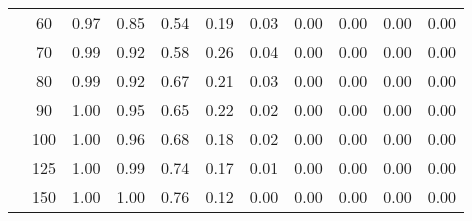\begin{table}[t]
\begin{center}
\begin{subtable}[c]{\textwidth}
\begin{center}
\begin{tabular}{rcccccccccc}
                                        & \multicolumn{1}{c|}{60}  & \num{0.97}  & \num{0.85}  & \num{0.54}  & \num{0.19}  & \num{0.03}  & \num{0.00}  & \num{0.00}  & \num{0.00}  & \num{0.00}  \\
                                        & \multicolumn{1}{c|}{70}  & \num{0.99}  & \num{0.92}  & \num{0.58}  & \num{0.26}  & \num{0.04}  & \num{0.00}  & \num{0.00}  & \num{0.00}  & \num{0.00}  \\
                                        & \multicolumn{1}{c|}{80}  & \num{0.99}  & \num{0.92}  & \num{0.67}  & \num{0.21}  & \num{0.03}  & \num{0.00}  & \num{0.00}  & \num{0.00}  & \num{0.00}  \\
                                        & \multicolumn{1}{c|}{90}  & \num{1.00}  & \num{0.95}  & \num{0.65}  & \num{0.22}  & \num{0.02}  & \num{0.00}  & \num{0.00}  & \num{0.00}  & \num{0.00}  \\
                                        & \multicolumn{1}{c|}{100}  & \num{1.00}  & \num{0.96}  & \num{0.68}  & \num{0.18}  & \num{0.02}  & \num{0.00}  & \num{0.00}  & \num{0.00}  & \num{0.00}  \\
                                        & \multicolumn{1}{c|}{125}  & \num{1.00}  & \num{0.99}  & \num{0.74}  & \num{0.17}  & \num{0.01}  & \num{0.00}  & \num{0.00}  & \num{0.00}  & \num{0.00}  \\
                                        & \multicolumn{1}{c|}{150}  & \num{1.00}  & \num{1.00}  & \num{0.76}  & \num{0.12}  & \num{0.00}  & \num{0.00}  & \num{0.00}  & \num{0.00}  & \num{0.00}  \\
                                    \end{tabular}
            \end{center}
        \end{subtable}

        \vspace{5mm}


\end{center}
\end{table}
